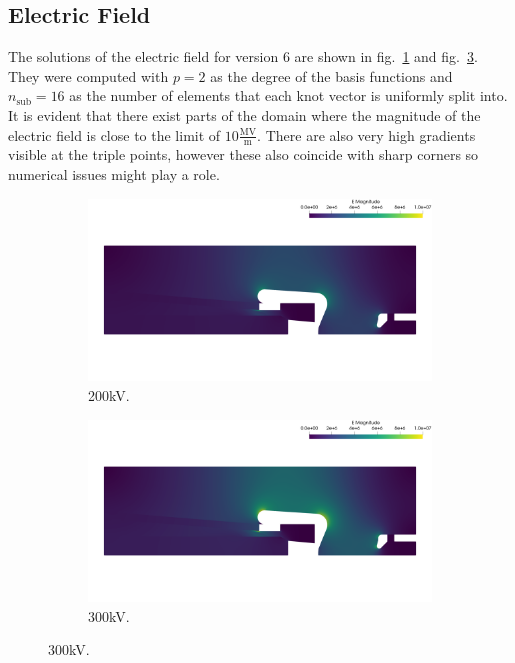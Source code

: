 \subsection{Electric Field}
The solutions of the electric field for version 6 are shown in fig.~\ref{fig:200kV_v6} and fig.~\ref{fig:300kV_v6}.
They were computed with $p=2$ as the degree of the basis functions and $n_\mathrm{sub}=16$ as the number of elements that each knot vector is uniformly split into.
It is evident that there exist parts of the domain where the magnitude of the electric field is close to the limit of $10 \frac{\mathrm{MV}}{\mathrm{m}}$. There are also very high gradients visible at the triple points, however these also coincide with sharp corners so numerical issues might play a role.

\begin{center}
\begin{figure}[H]
   \begin{subfigure}{0.45\textwidth}
      \includegraphics[width=\textwidth]{fig/200kV_v6}
      \caption{200kV.}
      \label{fig:200kV_v6}
   \end{subfigure}
   \begin{subfigure}{0.45\textwidth}
      \includegraphics[width=\textwidth]{fig/300kV_v6}
      \caption{300kV.}
      \label{fig:300kV_v6}
   \end{subfigure}
\end{figure}
\end{center}

